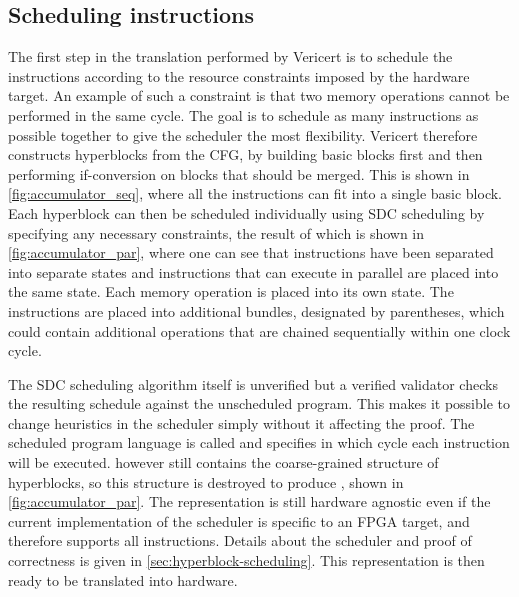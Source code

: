 \subsection{Scheduling \rtl{} instructions}

The first step in the translation performed by Vericert is to schedule the
instructions according to the resource constraints imposed by the hardware
target.  An example of such a constraint is that two memory operations cannot be
performed in the same cycle.  The goal is to schedule as many instructions as
possible together to give the scheduler the most flexibility.  Vericert
therefore constructs hyperblocks from the \rtl{} \gls{CFG}, by building basic
blocks first and then performing if-conversion on blocks that should be merged.
This is shown in \cref{fig:accumulator_seq}, where all the instructions can fit
into a single basic block.  Each hyperblock can then be scheduled individually
using \gls{SDC} scheduling by specifying any necessary constraints, the result
of which is shown in \cref{fig:accumulator_par}, where one can see that
instructions have been separated into separate states and instructions that can
execute in parallel are placed into the same state.  Each memory operation is
placed into its own state.  The instructions are placed into additional bundles,
designated by parentheses, which could contain additional operations that are
chained sequentially within one clock cycle.

The \gls{SDC} scheduling algorithm itself is unverified but a verified validator
checks the resulting schedule against the unscheduled program.  This makes it
possible to change heuristics in the scheduler simply without it affecting the
proof.  The scheduled program language is called \rtlpar{} and specifies in
which cycle each instruction will be executed.  \rtlpar{} however still contains
the coarse-grained structure of hyperblocks, so this structure is destroyed to
produce \rtlsubpar{}, shown in \cref{fig:accumulator_par}.  The representation
is still hardware agnostic even if the current implementation of the scheduler
is specific to an \gls{FPGA} target, and therefore supports all \rtl{}
instructions.  Details about the scheduler and proof of correctness is given in
\cref{sec:hyperblock-scheduling}.  This representation is then ready to be
translated into hardware.

